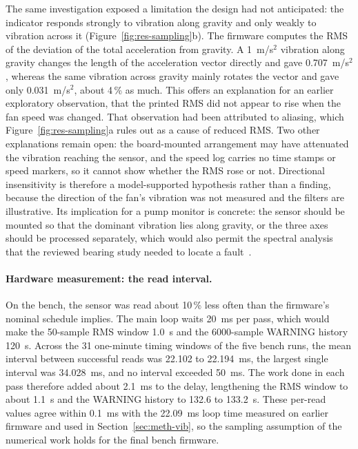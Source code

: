 The same investigation exposed a limitation the design had not anticipated: the indicator responds
strongly to vibration along gravity and only weakly to vibration across it
(Figure~\ref{fig:res-sampling}b). The firmware computes the RMS of the deviation of the total
acceleration from gravity. A 1~m/s$^2$ vibration along gravity changes the length of the acceleration
vector directly and gave 0.707~m/s$^2$, whereas the same vibration across gravity mainly rotates the
vector and gave only 0.031~m/s$^2$, about 4\,\% as much. This offers an explanation for an earlier exploratory
observation, that the printed RMS did not appear to rise when the fan speed was changed.
That observation had been attributed to aliasing, which Figure~\ref{fig:res-sampling}a rules out as a
cause of reduced RMS. Two other explanations remain open: the board-mounted arrangement may have
attenuated the vibration reaching the sensor, and the speed log carries no time stamps or speed
markers, so it cannot show whether the RMS rose or not. Directional insensitivity is therefore a
model-supported hypothesis rather than a finding, because the direction of the fan's vibration was not
measured and the filters are illustrative. Its implication for a pump monitor is concrete: the sensor
should be mounted so that the dominant vibration lies along gravity, or the three axes should be
processed separately, which would also permit the spectral analysis that the reviewed bearing study
needed to locate a fault~\cite{kumar2024}.

\paragraph{Hardware measurement: the read interval.}
On the bench, the sensor was read about 10\,\% less often than the firmware's nominal schedule
implies. The main loop waits 20~ms per pass, which would make the 50-sample RMS window 1.0~s and the
6000-sample WARNING history 120~s. Across the 31 one-minute timing windows of the five bench runs,
the mean interval between successful reads was 22.102 to 22.194~ms, the largest single interval was
34.028~ms, and no interval exceeded 50~ms. The work done in each pass therefore added about 2.1~ms to
the delay, lengthening the RMS window to about 1.1~s and the WARNING history to 132.6 to 133.2~s.
These per-read values agree within 0.1~ms with the 22.09~ms loop time measured on earlier firmware and
used in Section~\ref{sec:meth-vib}, so the sampling assumption of the numerical work holds for the
final bench firmware.

